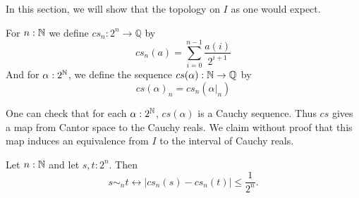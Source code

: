 In this section, we will show that the topology on $I$ as one would expect. 

\begin{definition}
  For $n:\mathbb{N}$ we define 
  $cs_n:2^n \to \mathbb Q$ by 
  \begin{equation}
    cs_n(a) = \sum\limits_{i=0}^{n-1} \frac{a(i)} {2^{i+1}}
  \end{equation}
  And for $\alpha:2^{\mathbb{N}}$, we define the sequence $cs(\alpha) : \mathbb{N} \to \mathbb Q$ by 
  \begin{equation}
    cs(\alpha)_n = cs_n(\alpha|_n)
  \end{equation}
\end{definition}
\begin{remark}
  One can check that for each $\alpha:2^{\mathbb{N}}$, 
  $cs(\alpha)$ is a Cauchy sequence. 
  Thus $cs$ gives a map from Cantor space to the Cauchy reals. 
  We claim without proof that
  this map induces an equivalence from $I$ to the interval of Cauchy reals. 
\end{remark}

\begin{lemma}
  Let $n:\mathbb{N}$ and let $s,t:2^n$. Then 
  \begin{equation}
    s\sim_n t \leftrightarrow |cs_n(s) - cs_n(t)| \leq \frac{1}{2^{n}}.
  \end{equation} 
\end{lemma}


